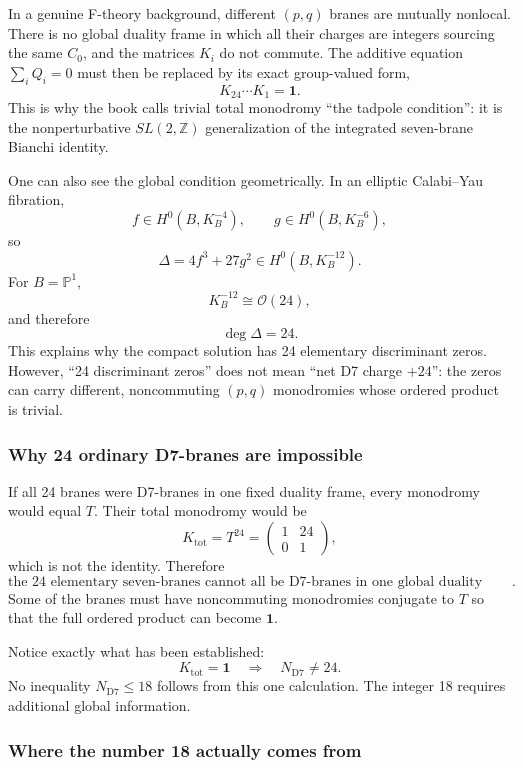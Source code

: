 \documentclass[
  10pt,
  a4paper,
  openany]{book}
\begin{document}
In a genuine F-theory background, different \((p,q)\) branes are
mutually nonlocal. There is no global duality frame in which all their
charges are integers sourcing the same \(C_0\), and the matrices \(K_i\)
do not commute. The additive equation \(\sum_iQ_i=0\) must then be
replaced by its exact group-valued form, \[
\boxed{
K_{24}\cdots K_1=\mathbf1
}.
\] This is why the book calls trivial total monodromy ``the tadpole
condition'': it is the nonperturbative \(SL(2,\mathbb Z)\)
generalization of the integrated seven-brane Bianchi identity.

One can also see the global condition geometrically. In an elliptic
Calabi--Yau fibration, \[
f\in H^0(B,K_B^{-4}),
\qquad
g\in H^0(B,K_B^{-6}),
\] so \[
\Delta=4f^3+27g^2
\in H^0(B,K_B^{-12}).
\] For \(B=\mathbb P^1\), \[
K_B^{-12}\cong\mathcal O(24),
\] and therefore \[
\deg\Delta=24.
\] This explains why the compact solution has 24 elementary discriminant
zeros. However, ``24 discriminant zeros'' does not mean ``net D7 charge
\(+24\)'': the zeros can carry different, noncommuting \((p,q)\)
monodromies whose ordered product is trivial.

\subsubsection{Why 24 ordinary D7-branes are
impossible}\label{why-24-ordinary-d7-branes-are-impossible}

If all 24 branes were D7-branes in one fixed duality frame, every
monodromy would equal \(T\). Their total monodromy would be \[
K_{\mathrm{tot}}
=T^{24}
=
\begin{pmatrix}
1&24\\
0&1
\end{pmatrix},
\] which is not the identity. Therefore \[
\boxed{
\text{the 24 elementary seven-branes cannot all be D7-branes
in one global duality frame}
}.
\] Some of the branes must have noncommuting monodromies conjugate to
\(T\) so that the full ordered product can become \(\mathbf1\).

Notice exactly what has been established: \[
K_{\mathrm{tot}}=\mathbf1
\quad\Longrightarrow\quad
N_{\mathrm{D7}}\neq24.
\] No inequality \(N_{\mathrm{D7}}\leq18\) follows from this one
calculation. The integer 18 requires additional global information.

\subsubsection{Where the number 18 actually comes
from}\label{where-the-number-18-actually-comes-from}
\end{document}
